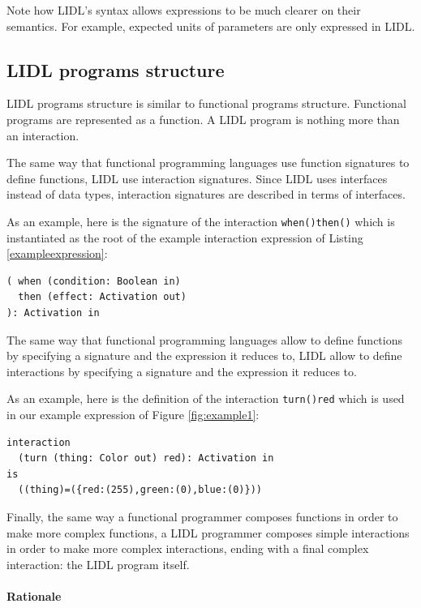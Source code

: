 \documentclass[10pt]{sigplanconf}
\newcommand{\code}[1]{\lstinline{#1}}
\begin{document}
Note how LIDL's syntax allows expressions to be much clearer on their semantics. For example, expected units of parameters are only expressed in LIDL.


\subsection{LIDL programs structure}

LIDL programs structure is similar to functional programs structure. Functional programs are represented as a function. A LIDL program is nothing more than an interaction.

The same way that functional programming languages use function signatures to define functions, LIDL use interaction signatures. Since LIDL uses interfaces instead of data types, interaction signatures are described in terms of  interfaces.

As an example, here is the signature of the interaction \code{when()then()} which is instantiated as the root of the example interaction expression of Listing \ref{exampleexpression}:

\begin{lstlisting}[caption=The signature of an interaction,label=examplesignature]
( when (condition: Boolean in) 
  then (effect: Activation out)
): Activation in
\end{lstlisting}

The same way that functional programming languages allow to define functions by specifying a signature and the expression it reduces to, LIDL allow to define interactions by specifying a signature and the expression it reduces to. 

As an example, here is the definition of the interaction \code{turn()red} which is used in our example expression of Figure \ref{fig:example1}:

\begin{lstlisting}[caption=Complete LIDL definition of an interaction,label=exampledefinition]
interaction
  (turn (thing: Color out) red): Activation in
is
  ((thing)=({red:(255),green:(0),blue:(0)}))
\end{lstlisting}


Finally, the same way a functional programmer composes functions in order to make more complex functions, a LIDL programmer composes simple interactions in order to make more complex interactions, ending with a final complex interaction: the LIDL program itself. 



\paragraph{Rationale}
\end{document}
